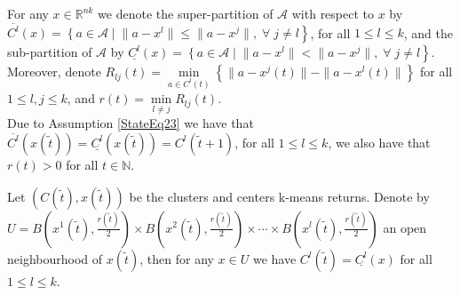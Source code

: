 For any $x \in \mathbb{R}^{nk}$ we denote the super-partition of $\mathcal{A}$ with respect to $x$ by $\overline{C^l}(x) = \left\lbrace a \in \mathcal{A} \mid \right. \left. \|a - x^l\| \leq \|a - x^j\| , \; \forall \; j \neq l \right\rbrace$, for all $1 \leq l \leq k$, and the sub-partition of $\mathcal{A}$ by $\underline{C^l}(x) = \left\lbrace a \in \mathcal{A} \mid \right. \left. \|a - x^l\| < \|a - x^j\|, \; \forall \; j \neq l \right\rbrace$.
Moreover, denote $R_{lj}(t) = \min\limits_{a \in C^l(t)} \left\lbrace \|a - x^j(t)\| - \|a - x^l(t)\| \right\rbrace$ for all $1 \leq l,j \leq k$, and $r(t) = \min\limits_{l \neq j} R_{lj}(t)$. \\
Due to Assumption \ref{StateEq23} we have that $\overline{C^l}(x(\widetilde{t})) = \underline{C^l}(x(\widetilde{t})) = C^l(\widetilde{t}+1)$, for all $1 \leq l \leq k$, we also have that $r(t) > 0$ for all $t \in \mathbb{N}$.

\begin{proposition} \label{StateEq24}
Let $(C(\widetilde{t}), x(\widetilde{t}))$ be the clusters and centers k-means returns. Denote by $U = B\left( x^1(\widetilde{t}),\frac{r(\widetilde{t})}{2}\right) \times  B\left( x^2(\widetilde{t}),\frac{r(\widetilde{t})}{2}\right) \times \cdots \times B\left( x^l(\widetilde{t}),\frac{r(\widetilde{t})}{2} \right)$ an open neighbourhood of $x(\widetilde{t})$, then for any $x \in U$ we have $C^l(\widetilde{t}) = \underline{C^l}(x)$ for all $1 \leq l \leq k$.
\end{proposition}

